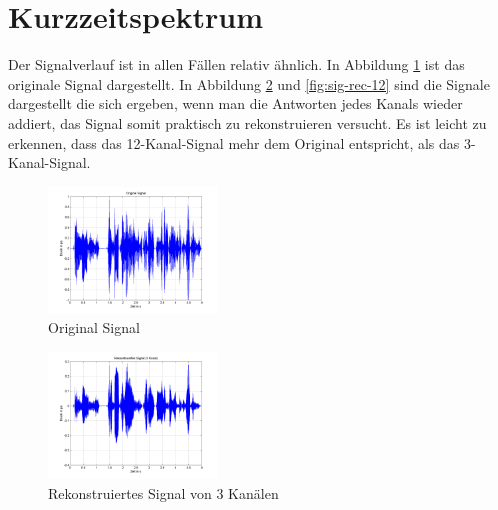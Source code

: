 \documentclass[conference]{IEEEtran}
\begin{document}
\section{Kurzzeitspektrum}
\begin{compactenum}[a)]
\item Der Signalverlauf ist in allen Fällen relativ ähnlich. In Abbildung \ref{fig:sig-orig} ist das originale Signal dargestellt. In Abbildung \ref{fig:sig-rec-3} und \ref{fig:sig-rec-12} sind die Signale dargestellt die sich ergeben, wenn man die Antworten jedes Kanals wieder addiert, das Signal somit praktisch zu rekonstruieren versucht. Es ist leicht zu erkennen, dass das 12-Kanal-Signal mehr dem Original entspricht, als das 3-Kanal-Signal. 
\begin{figure}[h!]
	\vspace{-5pt}
	\centering
	\includegraphics[width=0.4\textwidth]{img/sig_orig.png}
	\vspace{-10pt}
	\caption{Original Signal}
	\vspace{-10pt}
	\label{fig:sig-orig}
\end{figure}

\begin{figure}[h!]
	\vspace{-5pt}
	\centering
	\includegraphics[width=0.4\textwidth]{img/sig_rec_3.png}
	\vspace{-10pt}
	\caption{Rekonstruiertes Signal von 3 Kanälen}
	\vspace{-10pt}
	\label{fig:sig-rec-3}
\end{figure}


\end{compactenum}
\end{document}
